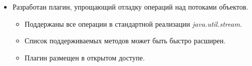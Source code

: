\begin{frame}
\frametitle{\insertsection} 
\framesubtitle{\insertsubsection}
\begin{itemize}
	\item Разработан плагин, упрощающий отладку операций над потоками объектов.
	\begin{itemize}
		\item Поддержаны все операции в стандартной реализации \textit{java.util.stream}.
		\item Список поддерживаемых методов может быть быстро расширен.
		\item Плагин размещен в открытом доступе.
	\end{itemize}
	
\end{itemize}
\end{frame}
 